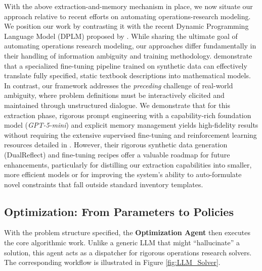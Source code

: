 \begin{remark}
    With the above extraction-and-memory mechanism in place, we now situate our approach relative to recent efforts on automating operations-research modeling.
    We position our work by contrasting it with the recent Dynamic Programming Language Model (DPLM) proposed by \citet{zhou2025auto}. While sharing the ultimate goal of automating operations research modeling, our approaches differ fundamentally in their handling of information ambiguity and training methodology. \citet{zhou2025auto} demonstrate that a specialized fine-tuning pipeline trained on synthetic data can effectively translate fully specified, static textbook descriptions into mathematical models. In contrast, our framework addresses the \emph{preceding} challenge of real-world ambiguity, where problem definitions must be interactively elicited and maintained through unstructured dialogue. We demonstrate that for this extraction phase, rigorous prompt engineering with a capability-rich foundation model (\emph{GPT-5-mini}) and explicit memory management yields high-fidelity results without requiring the extensive supervised fine-tuning and reinforcement learning resources detailed in \citet{zhou2025auto}. However, their rigorous synthetic data generation (DualReflect) and fine-tuning recipes offer a valuable roadmap for future enhancements, particularly for distilling our extraction capabilities into smaller, more efficient models or for improving the system's ability to auto-formulate novel constraints that fall outside standard inventory templates.
\end{remark}
    
    

    
    

    \subsection{Optimization: From Parameters to Policies}



    With the problem structure specified, the \textbf{Optimization Agent} then executes the core algorithmic work. Unlike a generic LLM that might ``hallucinate'' a solution, this agent acts as a dispatcher for rigorous operations research solvers. The corresponding workflow is illustrated in Figure \ref{fig:LLM_Solver}.

    






